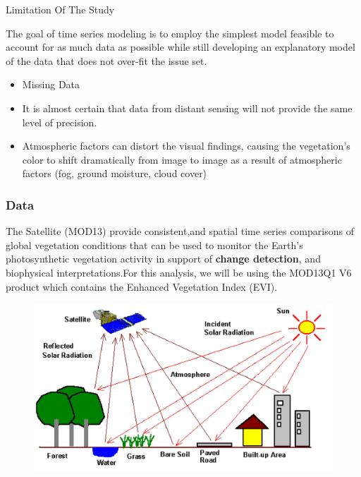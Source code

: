 \documentclass[11pt]{beamer}
\begin{document}
\begin{frame}
	\begin{block}{Limitation Of The Study}		
	
The goal of time series modeling is to employ the simplest model feasible to account for as much data as possible while still developing an explanatory model of the data that does not over-fit the issue set.

\begin{itemize}
	\item Missing Data
	\item It is almost certain that data from distant sensing will not provide the same level of precision.
	\item Atmospheric factors can distort the visual findings, causing the vegetation's color to shift dramatically from image to image as a result of atmospheric factors (fog, ground moisture, cloud cover)
\end{itemize}
	\end{block}
\end{frame}
\begin{frame}
	\frametitle{Data}
		
The Satellite (MOD13) provide consistent,and spatial time series comparisons of global vegetation conditions that can be used to monitor the Earth’s  photosynthetic vegetation activity in support of  \textbf{change detection}, and biophysical interpretations.For this analysis, we will be using the MOD13Q1 V6 product which contains the Enhanced Vegetation Index (EVI).
	\begin{figure}
		\centering
		\includegraphics[width=0.7\linewidth]{images/classification}
		\caption{}
		\label{fig:classification}
	\end{figure}
	
\end{frame}
\end{document}

